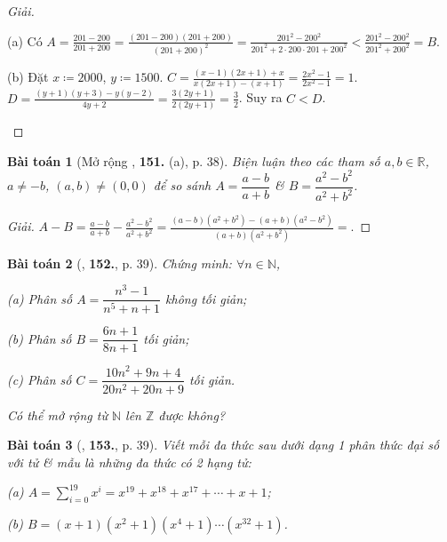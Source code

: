 \documentclass{article}
\numberwithin{equation}{section}
\newtheorem{baitoan}{Bài toán}
\begin{document}
\begin{proof}[Giải]
	\begin{enumerate*}
		\item[(a)] Có $A = \frac{201 - 200}{201 + 200} = \frac{(201 - 200)(201 + 200)}{(201 + 200)^2} = \frac{201^2 - 200^2}{201^2 + 2\cdot200\cdot201 + 200^2} < \frac{201^2 - 200^2}{201^2 + 200^2} = B$.
		\item[(b)] Đặt $x\coloneqq2000$, $y\coloneqq1500$. $C = \frac{(x - 1)(2x + 1) + x}{x(2x + 1) - (x + 1)} = \frac{2x^2 - 1}{2x^2 - 1} = 1$. $D = \frac{(y + 1)(y + 3) - y(y - 2)}{4y + 2} = \frac{3(2y + 1)}{2(2y + 1)} = \frac{3}{2}$. Suy ra $C < D$.
	\end{enumerate*}	
\end{proof}

\begin{baitoan}[Mở rộng \cite{Tuyen_Toan_8}, \textbf{151.} (a), p. 38]
	Biện luận theo các tham số $a,b\in\mathbb{R}$, $a\ne-b$, $(a,b)\ne(0,0)$ để so sánh $A = \dfrac{a - b}{a + b}$ \& $B = \dfrac{a^2 - b^2}{a^2 + b^2}$.
\end{baitoan}

\begin{proof}[Giải]
	$A - B = \frac{a - b}{a + b} - \frac{a^2 - b^2}{a^2 + b^2} = \frac{(a - b)(a^2 + b^2) - (a + b)(a^2 - b^2)}{(a + b)(a^2 + b^2)} = $.
\end{proof}

\begin{baitoan}[\cite{Tuyen_Toan_8}, \textbf{152.}, p. 39]
	Chứng minh: $\forall n\in\mathbb{N}$,
	\begin{enumerate*}
		\item[(a)] Phân số $A = \dfrac{n^3 - 1}{n^5 + n + 1}$ không tối giản;
		\item[(b)] Phân số $B = \dfrac{6n + 1}{8n + 1}$ tối giản;
		\item[(c)] Phân số $C = \dfrac{10n^2 + 9n + 4}{20n^2 + 20n + 9}$ tối giản.
	\end{enumerate*}
	Có thể mở rộng từ $\mathbb{N}$ lên $\mathbb{Z}$ được không?
\end{baitoan}

\begin{baitoan}[\cite{Tuyen_Toan_8}, \textbf{153.}, p. 39]
	Viết mỗi đa thức sau dưới dạng 1 phân thức đại số với tử \& mẫu là những đa thức có 2 hạng tử:
	\begin{enumerate*}
		\item[(a)] $A = \sum_{i=0}^{19} x^i = x^{19} + x^{18} + x^{17} + \cdots + x + 1$;
		\item[(b)] $B = (x + 1)(x^2 + 1)(x^4 + 1)\cdots(x^{32} + 1)$.
	\end{enumerate*}
\end{baitoan}
\end{document}

